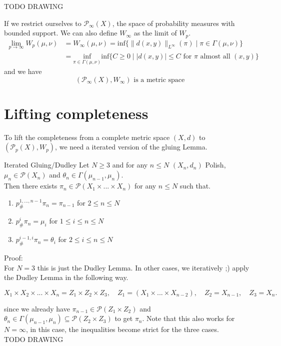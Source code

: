 \documentclass[15pt]{article}
\begin{document}
\bigbreak
TODO DRAWING


If we restrict ourselves to $\mathcal{P}_\infty(X)$, the space of probability measures with bounded support. We can also define $W_\infty$ as the limit of $W_p$.
\begin{align*}\lim_{p \to \infty} W_p(\mu,\nu) &= W_\infty(\mu,\nu) =\text{inf}\{\|d(x,y)\|_{L^\infty}(\pi) \mid \pi \in \Gamma(\mu,\nu)\} \\
&= \underset{\pi \in \Gamma(\mu,\nu)}{\text{inf}}\text{inf}\{C \geq 0 \mid |d(x,y)| \leq C \text{ for } \pi \text{ almost all } (x,y)\} \end{align*} 
and we have $$(\mathcal{P}_\infty(X), W_\infty) \text{ is a metric space}$$
\newpage
\section*{Lifting completeness}

To lift the completeness from a complete metric space $(X,d)$ to $(\mathcal{P}_p(X), W_p)$, we need a iterated version of the gluing Lemma.

\begin{lemma}{Iterated Gluing/Dudley}{}
  Let $N \geq 3$ and for any $n \leq N$ $(X_n,d_n)$ Polish, $\mu_n \in \mathcal{P}(X_n)$ and $\theta_n \in \Gamma(\mu_{n-1},\mu_n)$. \\ 
  Then there exists $\pi_n \in \mathcal{P}(X_1\times ... \times X_n)$ for any $n \leq N$ such that.
  \begin{enumerate}
      \item $p^{1,...,n-1}_{\#} \pi_n = \pi_{n-1}$ for $2 \leq n \leq N$
      \item $p^i_{\#} \pi_n = \mu_i$ for $1 \leq i \leq n \leq N$
      \item $p^{i-1,i}_{\#} \pi_n = \theta_i$ for $2 \leq i\leq n \leq N$
  \end{enumerate}
\end{lemma}

Proof: 
\vspace{0.3cm} \\

For $N = 3$ this is just the Dudley Lemma. In other cases, we iteratively ;) apply the Dudley Lemma in the following way. 

$$X_1 \times X_2 \times ... \times X_n = Z_1 \times Z_2 \times Z_3, \quad Z_1 = (X_1 \times ... \times X_{n-2}), \quad Z_2 = X_{n-1}, \quad Z_3 = X_n.$$

since we already have $\pi_{n-1} \in \mathcal{P}(Z_1 \times Z_2)$ and $\theta_n \in \Gamma(\mu_{n-1}, \mu_{n}) \subseteq \mathcal{P}(Z_2 \times Z_3)$ to get $\pi_n$. Note that this also works for $N = \infty$, in this case, the inequalities become strict for the three cases. \\
TODO DRAWING
\end{document}
